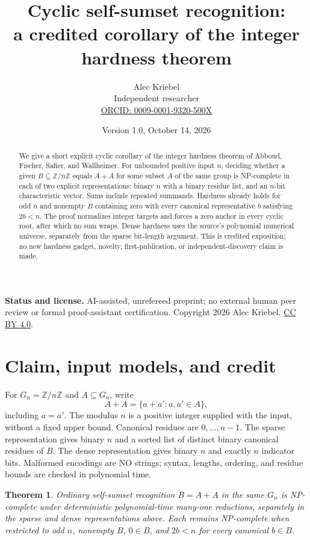 \documentclass[11pt]{article}
\title{Cyclic self-sumset recognition:\\a credited corollary of the integer hardness theorem}
\author{Alec Kriebel\\Independent researcher\\\small\href{https://orcid.org/0009-0001-9320-500X}{ORCID: 0009-0001-9320-500X}}
\date{Version 1.0, October 14, 2026}
\newtheorem{theorem}{Theorem}
\newcommand{\Z}{\mathbb Z}
\begin{document}
\maketitle
\begin{abstract}
We give a short explicit cyclic corollary of the integer hardness theorem of Abboud, Fischer, Safier, and Wallheimer. For unbounded positive input $n$, deciding whether a given $B\subseteq\Z/n\Z$ equals $A+A$ for some subset $A$ of the same group is NP-complete in each of two explicit representations: binary $n$ with a binary residue list, and an $n$-bit characteristic vector. Sums include repeated summands. Hardness already holds for odd $n$ and nonempty $B$ containing zero with every canonical representative $b$ satisfying $2b<n$. The proof normalizes integer targets and forces a zero anchor in every cyclic root, after which no sum wraps. Dense hardness uses the source's polynomial numerical universe, separately from the sparse bit-length argument. This is credited exposition; no new hardness gadget, novelty, first-publication, or independent-discovery claim is made.
\end{abstract}
\noindent\textbf{Status and license.} AI-assisted, unrefereed preprint; no external human peer review or formal proof-assistant certification. Copyright 2026 Alec Kriebel. \href{https://creativecommons.org/licenses/by/4.0/}{CC BY 4.0}.

\section{Claim, input models, and credit}
For $G_n=\Z/n\Z$ and $A\subseteq G_n$, write
\[
 A+A=\{a+a':a,a'\in A\},
\]
including $a=a'$. The modulus $n$ is a positive integer supplied with the input, without a fixed upper bound. Canonical residues are $0,\ldots,n-1$. The sparse representation gives binary $n$ and a sorted list of distinct binary canonical residues of $B$. The dense representation gives binary $n$ and exactly $n$ indicator bits. Malformed encodings are NO strings; syntax, lengths, ordering, and residue bounds are checked in polynomial time.

\begin{theorem}\label{thm:main}
Ordinary self-sumset recognition $B=A+A$ in the same $G_n$ is NP-complete under deterministic polynomial-time many-one reductions, separately in the sparse and dense representations above. Each remains NP-complete when restricted to odd $n$, nonempty $B$, $0\in B$, and $2b<n$ for every canonical $b\in B$.
\end{theorem}
\end{document}
